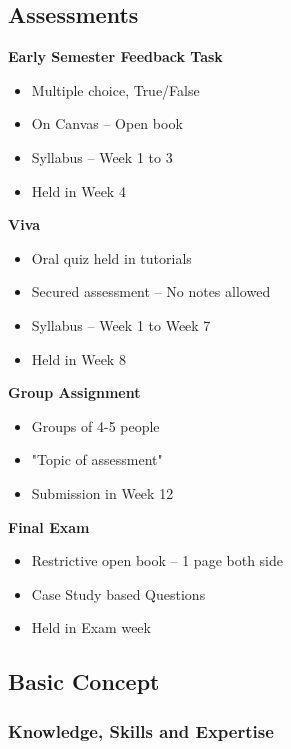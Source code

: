\subsection{Assessments}

\noindent\textbf{Early Semester Feedback Task}

\begin{itemize}
    \item Multiple choice, True/False
    \item On Canvas – Open book
    \item Syllabus – Week 1 to 3
    \item Held in Week 4
\end{itemize}

\bigskip

\noindent\textbf{Viva}

\begin{itemize}
    \item Oral quiz held in tutorials
    \item Secured assessment – No notes allowed
    \item Syllabus – Week 1 to Week 7
    \item Held in Week 8
\end{itemize}

\bigskip

\noindent\textbf{Group Assignment}

\begin{itemize}
    \item Groups of 4-5 people
    \item "Topic of assessment"
    \item Submission in Week 12
\end{itemize}

\bigskip

\noindent\textbf{Final Exam}

\begin{itemize}
    \item Restrictive open book – 1 page both side
    \item Case Study based Questions
    \item Held in Exam week
\end{itemize}

\subsection{Basic Concept}

\subsubsection{Knowledge, Skills and Expertise}

